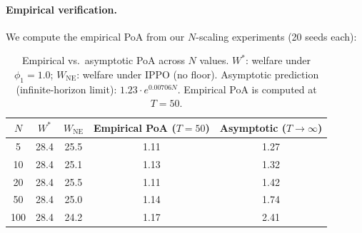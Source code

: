 \paragraph{Empirical verification.}
We compute the empirical PoA from our $N$-scaling experiments
(20 seeds each):
\begin{table}[h]
\centering
\small
\caption{Empirical vs.\ asymptotic PoA across $N$ values.
  $W^*$: welfare under $\phi_1 = 1.0$;
  $W_{\mathrm{NE}}$: welfare under IPPO (no floor).
  Asymptotic prediction (infinite-horizon limit):
  $1.23 \cdot e^{0.00706 N}$.
  Empirical PoA is computed at $T{=}50$.}
\label{tab:poa_scaling}
\begin{tabular}{ccccc}
\toprule
$N$ & $W^*$ & $W_{\mathrm{NE}}$ & Empirical PoA ($T{=}50$)
  & Asymptotic ($T{\to}\infty$) \\
\midrule
5   & 28.4 & 25.5 & 1.11 & 1.27 \\
10  & 28.4 & 25.1 & 1.13 & 1.32 \\
20  & 28.4 & 25.5 & 1.11 & 1.42 \\
50  & 28.4 & 25.0 & 1.14 & 1.74 \\
100 & 28.4 & 24.2 & 1.17 & 2.41 \\
\bottomrule
\end{tabular}
\end{table}

